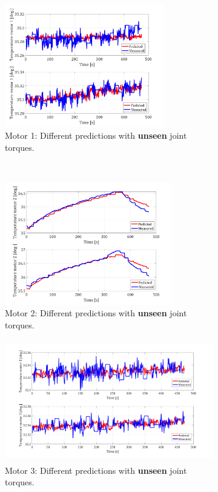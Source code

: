\documentclass{ifacconf}
\begin{document}
\begin{figure}[t!]
	\centering
	\begin{subfigure}[t]{\columnwidth}
		\centering
		\includegraphics[height=2.1in]{./pictures/applications/J1o.png}
		\caption{Motor 1: Different predictions with \textbf{unseen} joint torques.}
	\end{subfigure}%
	~ 
	\begin{subfigure}[t]{\columnwidth}
		\centering
		\includegraphics[height=2.1in]{./pictures/applications/J2o.png}
		\caption{Motor 2: Different predictions with \textbf{unseen} joint torques.}
	\end{subfigure}
	\begin{subfigure}[t]{\columnwidth}
		\includegraphics[height=2.1in]{./pictures/applications/J3o.png}
		\caption{Motor 3: Different predictions with \textbf{unseen} joint torques.}
	\end{subfigure}%
	~ 
	\begin{subfigure}[t]{\columnwidth}

\end{subfigure}
\end{figure}
\end{document}
